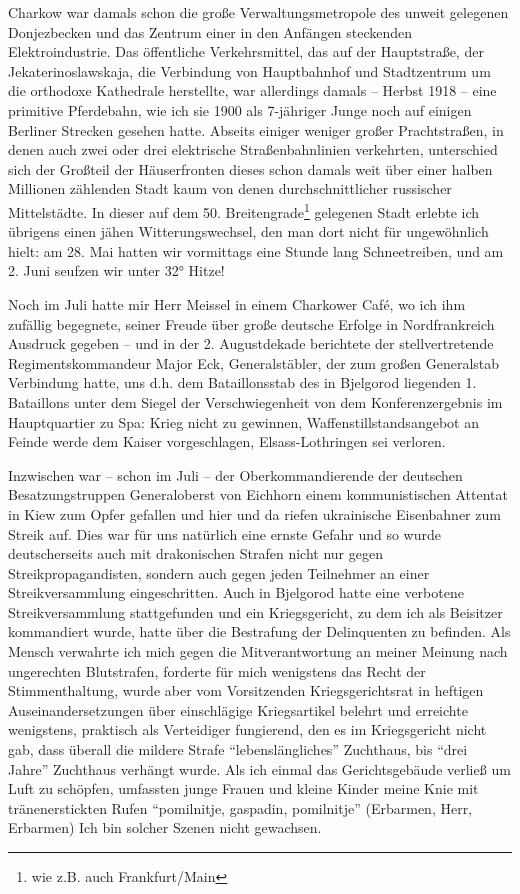 \documentclass[a5paper,pagesize,10pt,twoside=true]{scrbook}
\renewcommand{\marginpar}[2][]{}
\begin{document}
Charkow war damals schon die große Verwaltungsmetropole des unweit gelegenen Donjezbecken und das Zentrum einer in den Anfängen steckenden Elektroindustrie. Das öffentliche Verkehrsmittel, das auf der Hauptstraße, der Jekaterinoslawskaja, die Verbindung von Hauptbahnhof und Stadtzentrum um die orthodoxe Kathedrale herstellte, war allerdings damals -- Herbst 1918 -- eine primitive Pferdebahn, wie ich sie 1900 als 7-jähriger Junge noch auf einigen Berliner Strecken gesehen hatte. Abseits einiger weniger großer Prachtstraßen, in denen auch zwei oder drei elektrische Straßenbahnlinien verkehrten, unterschied sich der Großteil der Häuserfronten dieses schon damals weit über einer halben Millionen zählenden Stadt kaum von denen durchschnittlicher russischer Mittelstädte. In dieser auf dem 50. Breitengrade\footnote{wie z.B. auch Frankfurt/Main} gelegenen Stadt erlebte ich übrigens einen jähen Witterungswechsel, den man dort nicht für ungewöhnlich hielt: am 28. Mai hatten wir vormittags eine Stunde lang Schneetreiben, und am 2. Juni seufzen wir unter 32° Hitze!

Noch im Juli hatte mir Herr Meissel in einem Charkower Café, wo ich ihm zufällig begegnete, seiner Freude über große deutsche Erfolge in Nordfrankreich Ausdruck gegeben -- und in der 2. Augustdekade berichtete der stellvertretende Regimentskommandeur Major Eck, Generalstäbler, der zum großen Generalstab Verbindung hatte, uns d.h. dem Bataillonsstab des in Bjelgorod liegenden 1. Bataillons unter dem Siegel der Verschwiegenheit von dem Konferenzergebnis im Hauptquartier zu Spa: Krieg nicht zu gewinnen, Waffenstillstandsangebot an Feinde werde dem Kaiser vorgeschlagen, Elsass-Lothringen sei verloren.

\marginpar{375}
Inzwischen war -- schon im Juli -- der Oberkommandierende der deutschen Besatzungstruppen Generaloberst von Eichhorn einem kommunistischen Attentat in Kiew zum Opfer gefallen und hier und da riefen ukrainische Eisenbahner zum Streik auf. Dies war für uns natürlich eine ernste Gefahr und so wurde deutscherseits auch mit drakonischen Strafen nicht nur gegen Streikpropagandisten, sondern auch gegen jeden Teilnehmer an einer Streikversammlung eingeschritten. Auch in Bjelgorod hatte eine verbotene Streikversammlung stattgefunden und ein Kriegsgericht, zu dem ich als Beisitzer kommandiert wurde, hatte über die Bestrafung der Delinquenten zu befinden. Als Mensch verwahrte ich mich gegen die Mitverantwortung an meiner Meinung nach ungerechten Blutstrafen, forderte für mich wenigstens das Recht der Stimmenthaltung, wurde aber vom Vorsitzenden Kriegsgerichtsrat in heftigen Auseinandersetzungen über einschlägige Kriegsartikel belehrt und erreichte wenigstens, praktisch als Verteidiger fungierend, den es im Kriegsgericht nicht gab, dass überall die mildere Strafe \enquote{lebenslängliches} Zuchthaus, bis \enquote{drei Jahre} Zuchthaus verhängt wurde. Als ich einmal das Gerichtsgebäude verließ um Luft zu schöpfen, umfassten junge Frauen und kleine Kinder meine Knie mit tränenerstickten Rufen \enquote{pomilnitje, gaspadin, pomilnitje} (Erbarmen, Herr, Erbarmen) Ich bin solcher Szenen nicht gewachsen.
\end{document}
